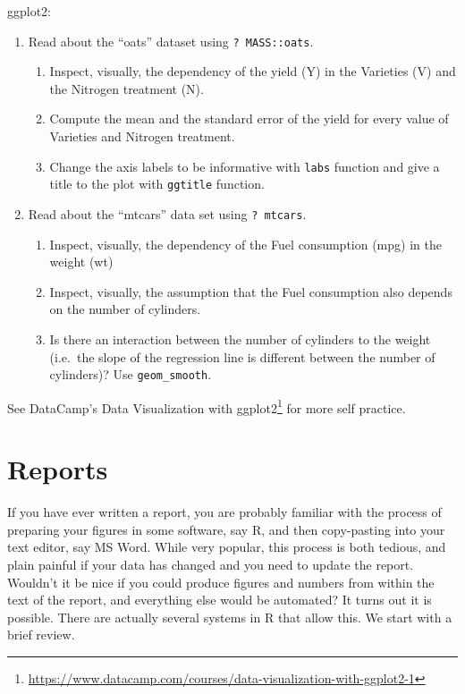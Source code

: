\documentclass[]{book}
\providecommand{\tightlist}{%
  \setlength{\itemsep}{0pt}\setlength{\parskip}{0pt}}
\renewcommand{\href}[2]{#2\footnote{\url{#1}}}
\theoremstyle{definition}
\theoremstyle{definition}
\theoremstyle{definition}
\theoremstyle{remark}
\begin{document}
ggplot2:

\begin{enumerate}
\def\labelenumi{\arabic{enumi}.}
\tightlist
\item
  Read about the ``oats'' dataset using \texttt{?\ MASS::oats}.

  \begin{enumerate}
  \def\labelenumii{\arabic{enumii}.}
  \tightlist
  \item
    Inspect, visually, the dependency of the yield (Y) in the Varieties (V) and the Nitrogen treatment (N).
  \item
    Compute the mean and the standard error of the yield for every value of Varieties and Nitrogen treatment.
  \item
    Change the axis labels to be informative with \texttt{labs} function and give a title to the plot with \texttt{ggtitle} function.
  \end{enumerate}
\item
  Read about the ``mtcars'' data set using \texttt{?\ mtcars}.

  \begin{enumerate}
  \def\labelenumii{\arabic{enumii}.}
  \tightlist
  \item
    Inspect, visually, the dependency of the Fuel consumption (mpg) in the weight (wt)
  \item
    Inspect, visually, the assumption that the Fuel consumption also depends on the number of cylinders.
  \item
    Is there an interaction between the number of cylinders to the weight (i.e.~the slope of the regression line is different between the number of cylinders)? Use \texttt{geom\_smooth}.
  \end{enumerate}
\end{enumerate}

See DataCamp's \href{https://www.datacamp.com/courses/data-visualization-with-ggplot2-1}{Data Visualization with ggplot2} for more self practice.

\hypertarget{report}{%
\chapter{Reports}\label{report}}

If you have ever written a report, you are probably familiar with the process of preparing your figures in some software, say R, and then copy-pasting into your text editor, say MS Word.
While very popular, this process is both tedious, and plain painful if your data has changed and you need to update the report.
Wouldn't it be nice if you could produce figures and numbers from within the text of the report, and everything else would be automated?
It turns out it is possible.
There are actually several systems in R that allow this.
We start with a brief review.
\end{document}
